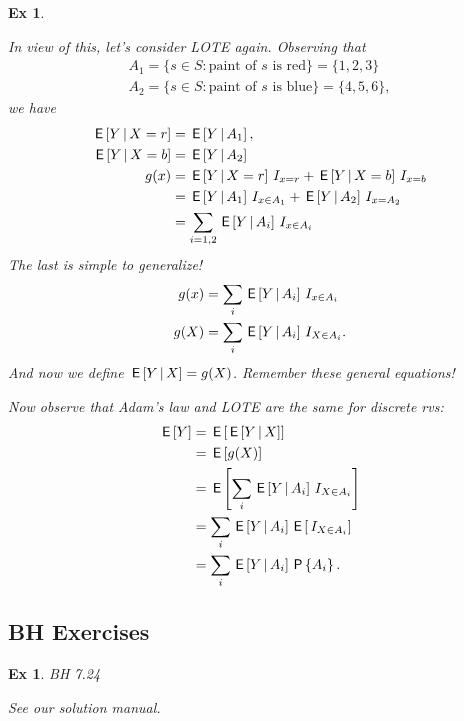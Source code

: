 \documentclass[a4paper,11pt]{article}
\newtheorem{exercise}[theorem]{Ex}
\begin{document}
\begin{exercise}
\begin{solution}
In view of this, let's consider LOTE again. Observing that
\begin{align}
A_{1} = \{s \in S : \textrm{paint of $s$ is red}\} = \{1, 2,3 \} \\
A_{2} = \{s \in S : \textrm{paint of $s$ is blue}\} = \{4, 5, 6\},
\end{align}
we have
\begin{align}
  \,\mathsf{E}\left[Y\,\middle|\, X=r\right] &= \,\mathsf{E}\left[Y\,\middle|\, A_{1}\right], \\
  \,\mathsf{E}\left[Y\,\middle|\, X=b\right] &= \,\mathsf{E}\left[Y\,\middle|\, A_{2}\right] \\
  g(x) &= \,\mathsf{E}\left[Y\,\middle|\, X=r\right] \,I_{x=r} + \,\mathsf{E}\left[Y\,\middle|\, X=b\right] \,I_{x=b} \\
   &= \,\mathsf{E}\left[Y\,\middle|\, A_{1}\right] \,I_{x\in A_{1}} + \,\mathsf{E}\left[Y\,\middle|\, A_{2}\right] \,I_{x=A_{2}} \\
 &= \sum_{i=1,2}  \,\mathsf{E}\left[Y\,\middle|\, A_{i}\right] \,I_{x\in A_{i}}
\end{align}
The last is simple to generalize!
\begin{align}
  g(x)  &= \sum_{i}  \,\mathsf{E}\left[Y\,\middle|\, A_{i}\right] \,I_{x\in A_{i}}  \\
  g(X)  &= \sum_{i}  \,\mathsf{E}\left[Y\,\middle|\, A_{i}\right] \,I_{X\in A_{i}}.
\end{align}
And now we define $\,\mathsf{E}\left[Y\,\middle|\, X\right] = g(X)$. Remember these general equations!


Now observe that Adam's law and LOTE are the same for discrete rvs:
\begin{align*}
\,\mathsf{E}\left[Y\right]
&= \,\mathsf{E}\left[\,\mathsf{E}\left[Y\,\middle|\, X\right]\right] \\
&= \,\mathsf{E}\left[g(X)\right] \\
&=\,\mathsf{E}\left[\sum_{i} \,\mathsf{E}\left[Y\,\middle|\, A_{i}\right] \,I_{X\in A_{i}}\right] \\
&=\sum_{i}  \,\mathsf{E}\left[Y\,\middle|\, A_{i}\right] \,\mathsf{E}\left[\,I_{X\in A_{i}}\right] \\
&=\sum_{i}  \,\mathsf{E}\left[Y\,\middle|\, A_{i}\right] \,\mathsf{P}\left\{A_{i}\right\}.
\end{align*}
\end{solution}
\end{exercise}



\subsection{BH Exercises}
\label{sec:bh-exercises-1}


\begin{exercise}
BH 7.24
\begin{solution}
See our solution manual.
\end{solution}
\end{exercise}
\end{document}
